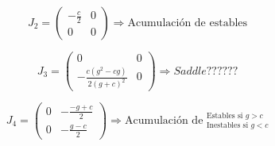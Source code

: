 \documentclass[twocolumn,aps,prl]{revtex4-1}
\begin{document}


$$J_2=
\begin{pmatrix}
    -\frac{c}{2}
    &
    0
    \\  
    0
    &
    0
\end{pmatrix}
\Rightarrow \text{Acumulación de estables} 
$$


$$J_3 =
\begin{pmatrix}
    0
    &
    0
    \\  
    -\frac{c\left(g^2-cg\right)}{2\left(g+c\right)^2}
    &
    0
\end{pmatrix}
\Rightarrow Saddle ??????
$$




$$J_4 =
\begin{pmatrix}
    0
    &
    -\frac{-g+c}{2}
    \\  
    0
    &
    -\frac{g-c}{2}
\end{pmatrix}
\Rightarrow \text{Acumulación de } ^{\text{Estables si } g>c}_{\text{Inestables si } g<c}
$$
\end{document}
